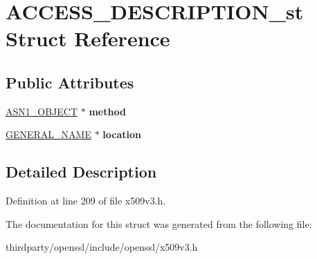 \hypertarget{struct_a_c_c_e_s_s___d_e_s_c_r_i_p_t_i_o_n__st}{}\section{A\+C\+C\+E\+S\+S\+\_\+\+D\+E\+S\+C\+R\+I\+P\+T\+I\+O\+N\+\_\+st Struct Reference}
\label{struct_a_c_c_e_s_s___d_e_s_c_r_i_p_t_i_o_n__st}
\subsection*{Public Attributes}
\begin{DoxyCompactItemize}
\item 
\mbox{\label{struct_a_c_c_e_s_s___d_e_s_c_r_i_p_t_i_o_n__st_afba634277470759ab5ca872db4693fe1}} 
\hyperlink{structasn1__object__st}{A\+S\+N1\+\_\+\+O\+B\+J\+E\+CT} $\ast$ {\bfseries method}
\item 
\mbox{\label{struct_a_c_c_e_s_s___d_e_s_c_r_i_p_t_i_o_n__st_ae554d8ab9233f6c313c43fc1de26a4ae}} 
\hyperlink{struct_g_e_n_e_r_a_l___n_a_m_e__st}{G\+E\+N\+E\+R\+A\+L\+\_\+\+N\+A\+ME} $\ast$ {\bfseries location}
\end{DoxyCompactItemize}


\subsection{Detailed Description}


Definition at line 209 of file x509v3.\+h.



The documentation for this struct was generated from the following file\+:\begin{DoxyCompactItemize}
\item 
thirdparty/openssl/include/openssl/x509v3.\+h\end{DoxyCompactItemize}
